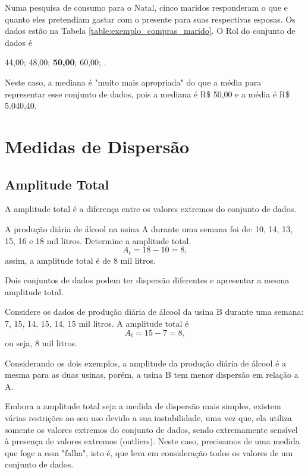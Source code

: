 \documentclass[11pt,fleqn]{book}
\numberwithin{mpicture}{chapter}
\numberwithin{mtable}{chapter}
\numberwithin{mframe}{chapter}
\begin{document}
\begin{example}
	Numa pesquisa de consumo para o Natal, cinco maridos responderam o que e quanto eles pretendiam gastar com o presente para suas respectivas esposas. Os dados estão na Tabela \ref{table:exemplo_compras_marido}. O Rol do conjunto de dados é
	\begin{center}
		44,00; 48,00; \textbf{50,00}; 60,00; .
	\end{center}
	Neste caso, a mediana é "muito mais apropriada" do que a média para representar esse conjunto de dados, pois a mediana é R\$ 50,00 e a média é R\$ 5.040,40.
\end{example}

\section{Medidas de Dispersão}

\subsection{Amplitude Total}

A amplitude total é a diferença entre os valores extremos do conjunto de dados.

\begin{example}
	A produção diária de álcool na usina A durante uma semana foi de: 10, 14, 13, 15, 16 e 18 mil litros. Determine a amplitude total.
	\[
		A_t=18-10=8\text{,}
	\]
	assim, a amplitude total é de 8 mil litros.
\end{example}

\begin{remark}
	Dois conjuntos de dados podem ter dispersão diferentes e apresentar a mesma amplitude total.
\end{remark}

\begin{example}
	Considere os dados de produção diária de álcool da usina B durante uma semana: 7, 15, 14, 15, 14, 15 mil litros. A amplitude total é 
	\[
		A_t = 15 - 7 = 8\text{,}
	\]
	ou seja, 8 mil litros.
\end{example}

Considerando os dois exemplos, a amplitude da produção diária de álcool é a mesma para as duas usinas, porém, a usina B tem menor dispersão em relação a A.

Embora a amplitude total seja a medida de dispersão mais simples, existem várias restrições ao seu uso devido a sua instabilidade, uma vez que, ela utiliza somente os valores extremos do conjunto de dados, sendo extremamente sensível à presença de valores extremos (outliers). Neste caso, precisamos de uma medida que foge a essa "falha", isto é, que leva em consideração todos os valores de um conjunto de dados.
\end{document}
